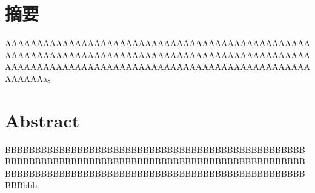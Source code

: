 \maketitle%
\MAKETITLE%
\makedeclaration%
\intobmk\chapter*{摘\quad 要}%
\setcounter{page}{1}%

AAAAAAAAAAAAAAAAAAAAAAAAAAAAAAAAAAAAAAAAAAAAAAAAAAAAAAAAAAAAAAAAAAAAAAAAAAAAAAAAAAAAAAAAAAAAAAAAAAAAAAAAAAAAAAAAAAAAAAAAAAAAAAAAAAAAAAAAAAAAAAAAAAAAAAa。

\intobmk\chapter*{Abstract}%

BBBBBBBBBBBBBBBBBBBBBBBBBBBBBBBBBBBBBBBBBBBBBBBBBBBBBBBBBBBBBBBBBBBBBBBBBBBBBBBBBBBBBBBBBBBBBBBBBBBBBBBBBBBBBBBBBBBBBBBBBBBBBBBBBBBBBBBBBBBBBBBBBBBBBBBBBbbb.

